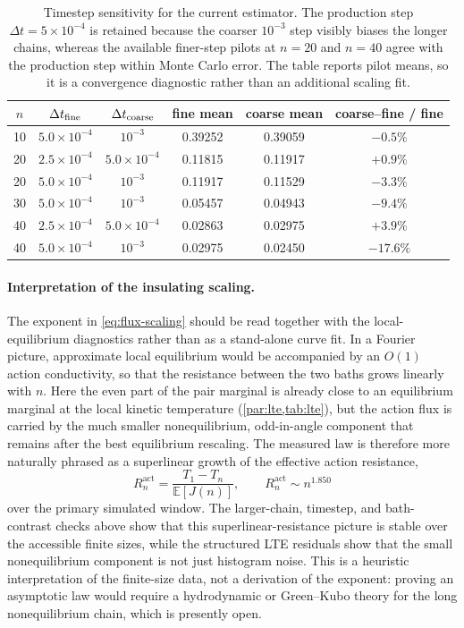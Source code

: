 \documentclass[11pt,a4paper]{article}
\theoremstyle{definition}
\newcommand{\E}{\mathbb{E}}
\numberwithin{equation}{section}   %
\begin{document}
\begin{table}[ht]\centering
\small
\begin{tabular}{cccccc}
\toprule
$n$ & $\Delta t_{\rm fine}$ & $\Delta t_{\rm coarse}$ &
fine mean & coarse mean & coarse--fine / fine \\
\midrule
10 & $5.0{\times}10^{-4}$ & $10^{-3}$ &
0.39252 & 0.39059 & $-0.5\%$ \\
20 & $2.5{\times}10^{-4}$ & $5.0{\times}10^{-4}$ &
0.11815 & 0.11917 & $+0.9\%$ \\
20 & $5.0{\times}10^{-4}$ & $10^{-3}$ &
0.11917 & 0.11529 & $-3.3\%$ \\
30 & $5.0{\times}10^{-4}$ & $10^{-3}$ &
0.05457 & 0.04943 & $-9.4\%$ \\
40 & $2.5{\times}10^{-4}$ & $5.0{\times}10^{-4}$ &
0.02863 & 0.02975 & $+3.9\%$ \\
40 & $5.0{\times}10^{-4}$ & $10^{-3}$ &
0.02975 & 0.02450 & $-17.6\%$ \\
\bottomrule
\end{tabular}
\caption{Timestep sensitivity for the current estimator. The production step
$\Delta t=5\times10^{-4}$ is retained because the coarser
$10^{-3}$ step visibly biases the longer chains, whereas the available
finer-step pilots at $n=20$ and $n=40$ agree with the production step within
Monte Carlo error. The table reports pilot means, so it is a convergence
diagnostic rather than an additional scaling fit.}
\label{tab:dt-sensitivity}
\end{table}

\paragraph{Interpretation of the insulating scaling.}
The exponent in \eqref{eq:flux-scaling} should be read together with the
local-equilibrium diagnostics rather than as a stand-alone curve fit.  In a
Fourier picture, approximate local equilibrium would be accompanied by an
$O(1)$ action conductivity, so that the resistance between the two baths grows
linearly with $n$.  Here the even part of the pair marginal is already close to
an equilibrium marginal at the local kinetic temperature
(\cref{par:lte,tab:lte}), but the action flux is carried by the much smaller
nonequilibrium, odd-in-angle component that remains after the best
equilibrium rescaling.  The measured law is therefore more naturally phrased
as a superlinear growth of the effective action resistance,
\[
  R_n^{\mathrm{act}}=\frac{T_1-T_n}{\E[J(n)]},
  \qquad
  R_n^{\mathrm{act}}\sim n^{1.850}
\]
over the primary simulated window.  The larger-chain, timestep, and
bath-contrast checks above show that this superlinear-resistance picture is
stable over the accessible finite sizes, while the structured LTE residuals
show that the small nonequilibrium component is not just histogram noise.
This is a heuristic interpretation of the finite-size data, not a derivation
of the exponent: proving an asymptotic law would require a hydrodynamic or
Green--Kubo theory for the long nonequilibrium chain, which is presently open.
\end{document}
